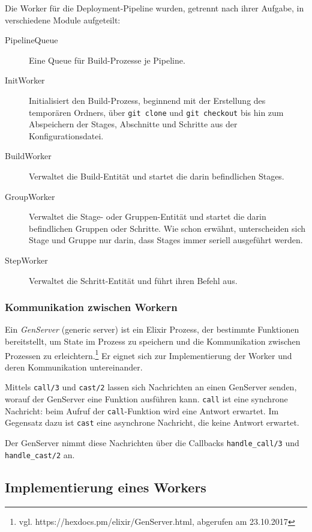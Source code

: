 Die Worker für die Deployment-Pipeline wurden, getrennt nach ihrer Aufgabe, in verschiedene Module aufgeteilt:

\begin{description}
  \item [PipelineQueue] Eine Queue für Build-Prozesse je Pipeline.
  \item [InitWorker] Initialisiert den Build-Prozess, beginnend mit der Erstellung des temporären Ordners, über \texttt{git clone} und \texttt{git checkout} bis hin zum Abspeichern der Stages, Abschnitte und Schritte aus der Konfigurationsdatei.
  \item [BuildWorker] Verwaltet die Build-Entität und startet die darin befindlichen Stages.
  \item [GroupWorker] Verwaltet die Stage- oder Gruppen-Entität und startet die darin befindlichen Gruppen oder Schritte. Wie schon erwähnt, unterscheiden sich Stage und Gruppe nur darin, dass Stages immer seriell ausgeführt werden.
  \item [StepWorker] Verwaltet die Schritt-Entität und führt ihren Befehl aus.
\end{description}

\subsubsection{Kommunikation zwischen Workern}

Ein \emph{GenServer} (generic server) ist ein Elixir Prozess, der bestimmte Funktionen bereitstellt, um State im Prozess zu speichern und die Kommunikation zwischen Prozessen zu erleichtern.\footnote{vgl. https://hexdocs.pm/elixir/GenServer.html, abgerufen am 23.10.2017} Er eignet sich zur Implementierung der Worker und deren Kommunikation untereinander.

Mittels \texttt{call/3} und \texttt{cast/2} lassen sich Nachrichten an einen GenServer senden, worauf der GenServer eine Funktion ausführen kann. \texttt{call} ist eine synchrone Nachricht: beim Aufruf der \texttt{call}-Funktion wird eine Antwort erwartet. Im Gegensatz dazu ist \texttt{cast} eine asynchrone Nachricht, die keine Antwort erwartet.

Der GenServer nimmt diese Nachrichten über die Callbacks \texttt{handle\_\allowbreak call/3} und \texttt{handle\_\allowbreak cast/2} an.

\subsection{Implementierung eines Workers}
\label{subsec:implementierung-worker}


